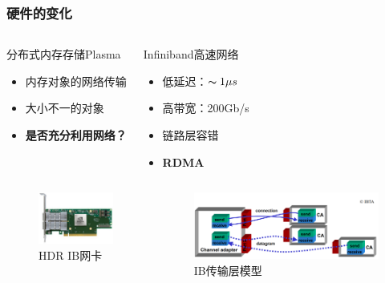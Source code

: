 \begin{frame}
	\frametitle{硬件的变化}

	\vspace{-1.5em}
	\begin{columns}[t]
		\begin{block}{分布式内存存储Plasma}
			\begin{itemize}
				\item 内存对象的网络传输
				\item 大小不一的对象
				\item \textbf{是否充分利用网络？}
			\end{itemize}
		\end{block}
		\begin{block}{Infiniband高速网络}
			\begin{itemize}
				\item 低延迟：$\thicksim 1\mu s$
				\item 高带宽：200Gb/s
				\item 链路层容错
				\item \textbf{RDMA}
			\end{itemize}
		\end{block}
	\end{columns}

	\begin{columns}[onlytextwidth]
		\begin{figure}
			\centering
			\includegraphics[scale=0.3]{image/presentation/hca.jpg}
			\caption{HDR IB网卡}
		\end{figure}
	
		\begin{figure}
			\centering
			\includegraphics[scale=0.13]{image/chap01/qp.png}
			\caption{IB传输层模型}
		\end{figure}
	\end{columns}
		
\end{frame}

